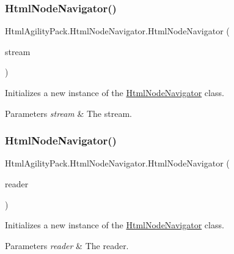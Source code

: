 \subsubsection{\texorpdfstring{Html\+Node\+Navigator()}{HtmlNodeNavigator()}\hspace{0.1cm}{\footnotesize\ttfamily [1/11]}}
{\footnotesize\ttfamily Html\+Agility\+Pack.\+Html\+Node\+Navigator.\+Html\+Node\+Navigator (\begin{DoxyParamCaption}\item[{Stream}]{stream }\end{DoxyParamCaption})\hspace{0.3cm}{\ttfamily [inline]}}



Initializes a new instance of the \hyperlink{class_html_agility_pack_1_1_html_node_navigator}{Html\+Node\+Navigator} class. 


\begin{DoxyParams}{Parameters}
{\em stream} & The stream.\\
\hline
\end{DoxyParams}
\mbox{\label{class_html_agility_pack_1_1_html_node_navigator_ac81f609b7631365884c346ee186457cd}} 
\subsubsection{\texorpdfstring{Html\+Node\+Navigator()}{HtmlNodeNavigator()}\hspace{0.1cm}{\footnotesize\ttfamily [2/11]}}
{\footnotesize\ttfamily Html\+Agility\+Pack.\+Html\+Node\+Navigator.\+Html\+Node\+Navigator (\begin{DoxyParamCaption}\item[{Text\+Reader}]{reader }\end{DoxyParamCaption})\hspace{0.3cm}{\ttfamily [inline]}}



Initializes a new instance of the \hyperlink{class_html_agility_pack_1_1_html_node_navigator}{Html\+Node\+Navigator} class. 


\begin{DoxyParams}{Parameters}
{\em reader} & The reader.\\
\hline
\end{DoxyParams}
\mbox{\label{class_html_agility_pack_1_1_html_node_navigator_add1218ba51639a54431ede39675372cb}} 
